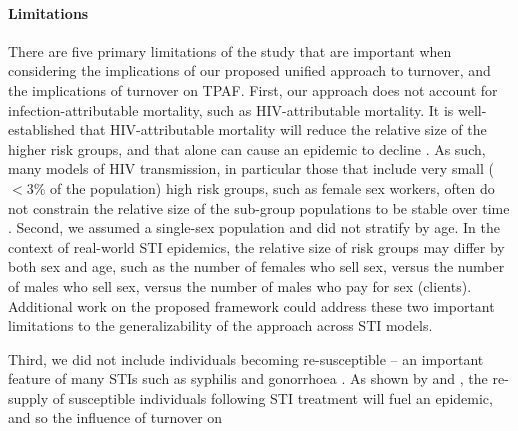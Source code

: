\paragraph{Limitations}
There are five primary limitations of the study that are important when considering
the implications of our proposed unified approach to turnover,
and the implications of turnover on TPAF.
First, our approach does not account for
infection-attributable mortality, such as HIV-attributable mortality.
It is well-established that HIV-attributable mortality will reduce the 
relative size of the higher risk groups,
and that alone can cause an epidemic to decline \citep{Boily1997}.
As such, many models of HIV transmission,
in particular those that include very small ($<3\%$ of the population)
high risk groups, such as female sex workers,
often do not constrain the relative size
of the sub-group populations to be stable over time
\citep{Pickles2013}.
Second, we assumed a single-sex population and did not stratify by age.
In the context of real-world STI epidemics,
the relative size of risk groups may differ
by both sex and age,
such as the number of females who sell sex,
versus the number of males who sell sex,
versus the number of males who pay for sex (clients).
Additional work on the proposed framework could address
these two important limitations to the generalizability of the approach across STI models.
\par
Third, we did not include individuals becoming re-susceptible
-- an important feature of many STIs such as syphilis and gonorrhoea
\citep{Fenton2008}.
As shown by \citet{Fenton2008} and \citet{Pourbohloul2003},
the re-supply of susceptible individuals following STI treatment
will fuel an epidemic, and so the influence of turnover on
